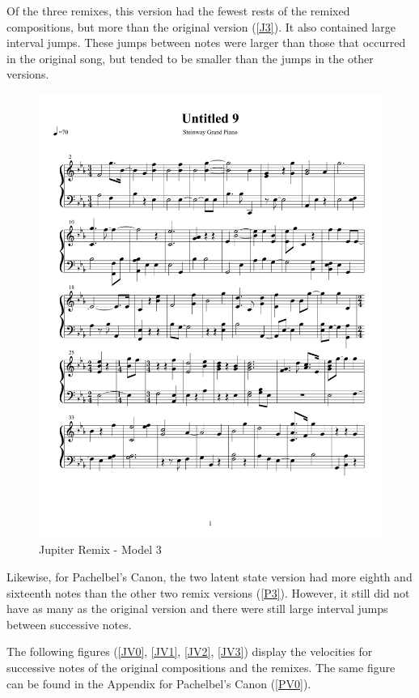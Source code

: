 \documentclass{article} %
\begin{document}
Of the three remixes, this version had the fewest rests of the remixed compositions, but more than the original version (\autoref{J3}). It also contained large interval jumps. These jumps between notes were larger than those that occurred in the original song, but tended to be smaller than the jumps in the other versions. 


\begin{figure}[H]
\centering

\includegraphics [scale = 0.6] {JupiterRemix2H-cropped.pdf}
\caption{Jupiter Remix - Model 3\label{J3}}
\end{figure}

Likewise, for Pachelbel's Canon, the two latent state version had more eighth and sixteenth notes than the other two remix versions (\autoref{P3}). However, it still did not have as many as the original version and there were still large interval jumps  between successive notes. 

The following figures (\autoref{JV0}, \autoref{JV1}, \autoref{JV2}, \autoref{JV3}) display the velocities for successive notes of the original compositions and the remixes. The same figure can be found in the Appendix for  Pachelbel's Canon (\autoref{PV0}). 
\end{document}
